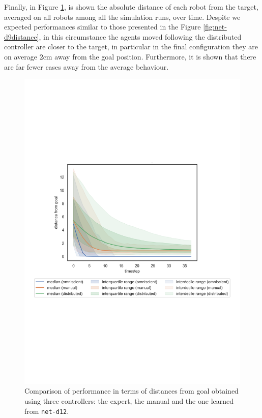 Finally, in Figure \ref{fig:net-d12distance}, is shown the absolute distance of 
each robot from the target, averaged on all robots among all the simulation runs, 
over time. 
Despite we expected performances similar to those presented in the Figure 
\ref{fig:net-d9distance}, in this circumstance the agents moved following the 
distributed controller are closer to the target, in particular in the final 
configuration they are on average $2$cm away from the goal position. 
Furthermore, it is shown that there are far fewer cases away from the average 
behaviour.
\begin{figure}[!htb]
	\centering
	\includegraphics[width=.65\textwidth]{contents/images/net-d12/distances-from-goal-compressed-distributed}%
	\caption[Evaluation of \texttt{net-d1} distances from goal.]{Comparison of 
		performance in terms of distances from goal obtained using three 
		controllers: 
		the expert, the manual and the one learned from \texttt{net-d12}.}
	\label{fig:net-d12distance}
\end{figure}

